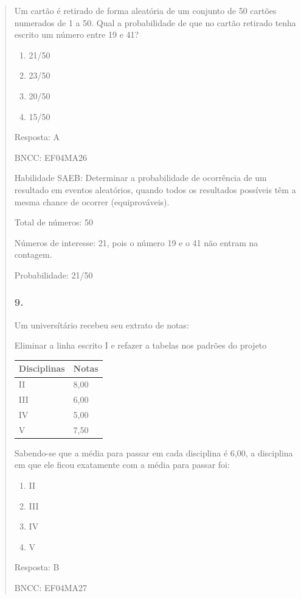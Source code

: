 \begin{enumerate}
\begin{escolha}
\begin{enumerate}
\begin{itemize}
\begin{itemize}
\begin{escolha}
\begin{quote}
\begin{escolha}
{Um cartão é retirado de forma aleatória de um conjunto de 50 cartões
numerados de 1 a 50. Qual a probabilidade de que no cartão retirado
tenha escrito um número entre 19 e 41?

\begin{enumerate}
\def\labelenumi{\alph{enumi})}
\item
  21/50
\item
  23/50
\item
  20/50
\item
  15/50
\end{enumerate}

Resposta: A

BNCC: EF04MA26

Habilidade SAEB: Determinar a probabilidade de ocorrência de um
resultado em eventos aleatórios, quando todos os resultados possíveis
têm a mesma chance de ocorrer (equiprováveis).

Total de números: 50

Números de interesse: 21, pois o número 19 e o 41 não entram na
contagem.

Probabilidade: 21/50

\subsubsection{9.}\label{section-180}

Um universítário recebeu seu extrato de notas:

Eliminar a linha escrito I e refazer a tabelas nos padrões do projeto

\begin{longtable}[]{@{}ll@{}}
\toprule
Disciplinas & Notas\tabularnewline
\midrule
\endhead
II & 8,00\tabularnewline
III & 6,00\tabularnewline
IV & 5,00\tabularnewline
V & 7,50\tabularnewline
\bottomrule
\end{longtable}

Sabendo-se que a média para passar em cada disciplina é 6,00, a
disciplina em que ele ficou exatamente com a média para passar foi:

\begin{enumerate}
\def\labelenumi{\alph{enumi})}
\item
  II
\item
  III
\item
  IV
\item
  V
\end{enumerate}

Resposta: B

BNCC: EF04MA27

}
\end{escolha}
\end{quote}
\end{escolha}
\end{itemize}
\end{itemize}
\end{enumerate}
\end{escolha}
\end{enumerate}
